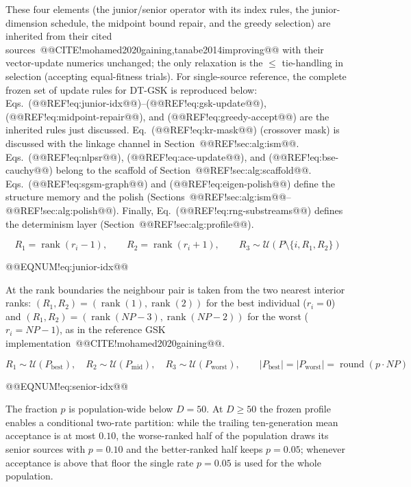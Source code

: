 \documentclass[10pt,a4paper]{article}
\newcommand{\dtgsk}{DT-GSK}
\begin{document}
These four elements (the junior/senior operator with its index
rules, the junior-dimension schedule, the midpoint bound repair, and
the greedy selection) are inherited from their cited
sources~@@CITE!mohamed2020gaining,tanabe2014improving@@ with their
vector-update numerics unchanged; the only relaxation is the $\le$
tie-handling in selection (accepting equal-fitness trials).
For single-source reference, the complete frozen set of update rules
for \dtgsk{} is reproduced below:
Eqs.~(@@REF!eq:junior-idx@@)--(@@REF!eq:gsk-update@@),
(@@REF!eq:midpoint-repair@@), and (@@REF!eq:greedy-accept@@) are the
inherited rules just discussed.
Eq.~(@@REF!eq:kr-mask@@) (crossover mask) is discussed with the linkage
channel in Section~@@REF!sec:alg:ism@@.
Eqs.~(@@REF!eq:nlpsr@@), (@@REF!eq:ace-update@@), and
(@@REF!eq:bse-cauchy@@) belong to the scaffold of
Section~@@REF!sec:alg:scaffold@@.
Eqs.~(@@REF!eq:sgsm-graph@@) and (@@REF!eq:eigen-polish@@) define the
structure memory and the polish
(Sections~@@REF!sec:alg:ism@@--@@REF!sec:alg:polish@@). Finally,
Eq.~(@@REF!eq:rng-substreams@@) defines the determinism layer
(Section~@@REF!sec:alg:profile@@).



















\[
R_1 = \operatorname{rank}(r_i - 1),\qquad
R_2 = \operatorname{rank}(r_i + 1),\qquad
R_3 \sim \mathcal{U}\!\left(P \setminus \{i, R_1, R_2\}\right)
\]

@@EQNUM!eq:junior-idx@@

At the rank boundaries the neighbour pair is taken from the two nearest interior ranks: $(R_1,R_2)=(\operatorname{rank}(1),\operatorname{rank}(2))$ for the best individual ($r_i=0$) and $(R_1,R_2)=(\operatorname{rank}(NP{-}3),\operatorname{rank}(NP{-}2))$ for the worst ($r_i=NP{-}1$), as in the reference GSK implementation~@@CITE!mohamed2020gaining@@.




\[
R_1 \sim \mathcal{U}(P_{\text{best}}),\quad
R_2 \sim \mathcal{U}(P_{\text{mid}}),\quad
R_3 \sim \mathcal{U}(P_{\text{worst}}),\qquad
|P_{\text{best}}| = |P_{\text{worst}}| = \operatorname{round}(p \cdot NP)
\]

@@EQNUM!eq:senior-idx@@

The fraction $p$ is population-wide below $D=50$. At $D\ge50$ the frozen profile enables a conditional two-rate partition: while the trailing ten-generation mean acceptance is at most $0.10$, the worse-ranked half of the population draws its senior sources with $p=0.10$ and the better-ranked half keeps $p=0.05$; whenever acceptance is above that floor the single rate $p=0.05$ is used for the whole population.
\end{document}
